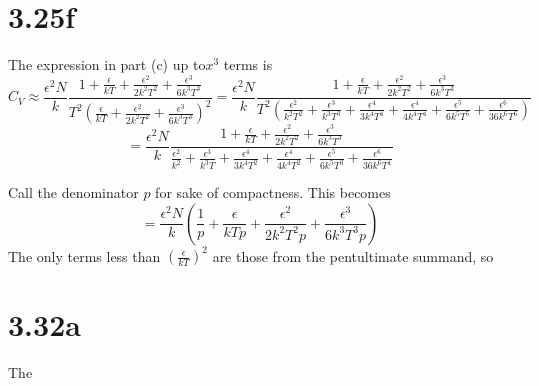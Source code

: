 \documentclass{article}
\begin{document}
\section*{3.25f}
The expression in part (c) up to$x^{3}$ terms is
\[C_{V}\approx \frac{\epsilon^{2}N}{k}\frac{1+\frac{\epsilon}{kT}+\frac{\epsilon^{2}}{2k^{2}T^{2}}+\frac{\epsilon^{3}}{6k^{3}T^{3}}}{T^{2}\left( \frac{\epsilon}{kT}+\frac{\epsilon^{2}}{2k^{2}T^{2}}+\frac{\epsilon^{3}}{6k^{3}T^{3}} \right)^{2}}=\frac{\epsilon^{2}N}{k}\frac{1+\frac{\epsilon}{kT}+\frac{\epsilon^{2}}{2k^{2}T^{2}}+\frac{\epsilon^{3}}{6k^{3}T^{3}}}{T^{2}\left( \frac{\epsilon^{2}}{k^{2}T^{2}}+\frac{\epsilon^{3}}{k^{3}T^{3}}+\frac{\epsilon^{4}}{3k^{4}T^{4}}+ \frac{\epsilon^{4}}{4k^{4}T^{4}}+\frac{\epsilon^{5}}{6k^{5}T^{5}}+\frac{\epsilon^{6}}{36k^{6}T^{6}}\right)}\]
\[=\frac{\epsilon^{2}N}{k}\frac{1+\frac{\epsilon}{kT}+\frac{\epsilon^{2}}{2k^{2}T^{2}}+\frac{\epsilon^{3}}{6k^{3}T^{3}}}{\frac{\epsilon^{2}}{k^{2}}+\frac{\epsilon^{3}}{k^{3}T}+\frac{\epsilon^{4}}{3k^{4}T^{2}}+\frac{\epsilon^{4}}{4k^{4}T^{2}}+\frac{\epsilon^{5}}{6k^{5}T^{3}}+\frac{\epsilon^{6}}{36k^{6}T^{4}}}\]

Call the denominator $p$ for sake of compactness. This becomes
\[=\frac{\epsilon^{2}N}{k}\left( \frac{1}{p}+\frac{\epsilon}{kTp}+\frac{\epsilon^{2}}{2k^{2}T^{2}p} +\frac{\epsilon^{3}}{6k^{3}T^{3}p}\right)\]
The only terms less than $\left(\frac{\epsilon}{kT}\right)^{2} $ are those from the pentultimate summand, so



\section*{3.32a}
The
\end{document}
